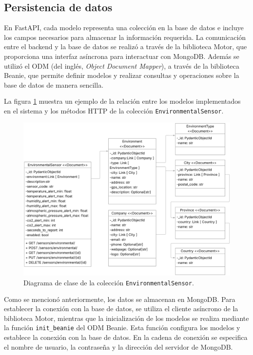 \subsection{Persistencia de datos}

En FastAPI, cada modelo representa una colección en la base de datos e incluye
los campos necesarios para almacenar la información requerida. La comunicación
entre el backend y la base de datos se realizó a través de la biblioteca Motor,
que proporciona una interfaz asíncrona para interactuar con MongoDB. Además se
utilizó el ODM (del inglés, \textit{Object Document Mapper}), a través de la
biblioteca Beanie, que permite definir modelos y realizar consultas y
operaciones sobre la base de datos de manera sencilla.

La figura \ref{fig:diagrama de clases} muestra un ejemplo de la relación entre
los modelos implementados en el sistema y los métodos HTTP de la colección
\texttt{EnvironmentalSensor}.

\begin{figure}[H]
    \centering
    \includegraphics[width=.88\textwidth]{./Images/18.png}
    \caption{Diagrama de clase de la colección \texttt{EnvironmentalSensor}.}
    \label{fig:diagrama de clases}
\end{figure}

Como se mencionó anteriormente, los datos se almacenan en MongoDB. Para
establecer la conexión con la base de datos, se utiliza el cliente asíncrono de
la biblioteca Motor, mientras que la inicialización de los modelos se realiza
mediante la función \texttt{init\_beanie} del ODM Beanie. Esta función
configura los modelos y establece la conexión con la base de datos. En la
cadena de conexión se especifica el nombre de usuario, la contraseña y la
dirección del servidor de MongoDB.

